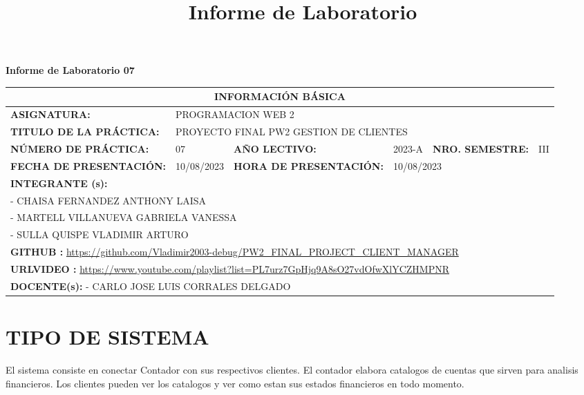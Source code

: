 \documentclass{article}
\title{Informe de Laboratorio}
\newcommand{\itemTeacher}{CARLO JOSE LUIS CORRALES DELGADO}
\newcommand{\itemGitHubURL}{https://github.com/Vladimir2003-debug/PW2_FINAL_PROJECT_CLIENT_MANAGER}
\newcommand{\itemCourse}{PROGRAMACION WEB 2}
\newcommand{\itemSemester}{III}
\newcommand{\itemPracticeNumber}{07}
\newcommand{\itemTheme}{PROYECTO FINAL PW2 GESTION DE CLIENTES}
\newcommand{\itemInput}{10/08/2023}
\newcommand{\itemOutput}{10/08/2023}
\begin{document}
\vspace*{30px}

\begin{center}	
		\fontsize{17}{17} \textbf{ Informe de Laboratorio \itemPracticeNumber}
\end{center}
 
\renewcommand{\arraystretch}{1.5}

\begin{tabular}{ |m{3cm}|m{2cm}|m{3cm}|m{1.2cm}|m{2.5cm}|m{1cm}| }
    \hline
    
    \multicolumn{6}{|c|}{\cellcolor{red}\textbf{INFORMACIÓN BÁSICA}} \\
    \hline
    \textbf{ASIGNATURA:} & \multicolumn{5}{|l|}{ \itemCourse} \\
    \hline
    \textbf{TITULO DE LA PRÁCTICA:} & \multicolumn{5}{|l|}{\itemTheme} \\
    \hline     
    \textbf{NÚMERO DE PRÁCTICA:} & \itemPracticeNumber & \textbf{AÑO LECTIVO:} & 2023-A & \textbf{NRO. SEMESTRE:} & \itemSemester\\
    \hline     
    \textbf{FECHA DE PRESENTACIÓN: } & \itemInput & \textbf{HORA DE PRESENTACIÓN:} & \multicolumn{3}{|l|}{ \itemOutput } \\
    \hline     
    \multicolumn{4}{|l|}{\textbf{INTEGRANTE (s):}} & & \\
    \multicolumn{4}{|l|}{- CHAISA FERNANDEZ ANTHONY LAISA}&  & \\
    \multicolumn{4}{|l|}{- MARTELL VILLANUEVA GABRIELA VANESSA}&  & \\
    \multicolumn{4}{|l|}{- SULLA QUISPE VLADIMIR ARTURO}&  & \\
    \hline
    \multicolumn{6}{|l|}{\textbf{GITHUB :} \url{\itemGitHubURL}} \\
    \hline
    \multicolumn{6}{|l|}{\textbf{URLVIDEO :} \url{https://www.youtube.com/playlist?list=PL7urz7GpHjq9A8sO27vdOfwXlYCZHMPNR}} \\
    \hline
    \multicolumn{6}{|l|}{\textbf{DOCENTE(s): }
    - \itemTeacher 
    } \\
    \hline     
\end{tabular}

\tableofcontents

\section{TIPO DE SISTEMA}

El sistema consiste en conectar Contador con sus respectivos clientes. El contador elabora catalogos de cuentas que sirven para analisis financieros. Los clientes pueden ver los catalogos y ver como estan sus estados financieros en todo momento.
\end{document}
